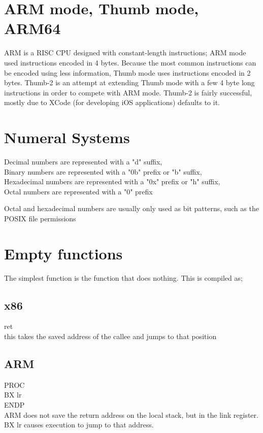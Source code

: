 \documentclass[11pt, a4paper, draft]{article}
\begin{document}
	
	\section*{ARM mode, Thumb mode, ARM64}
	ARM is a RISC CPU designed with constant-length instructions; ARM mode used instructions encoded in 4 bytes. Because the most common instructions can be encoded using less information, Thumb mode uses instructions encoded in 2 bytes. Thumb-2 is an attempt at extending Thumb mode with a few 4 byte long instructions in order to compete with ARM mode. Thumb-2 is fairly successful, mostly due to XCode (for developing iOS applications) defaults to it.
	
	\section*{Numeral Systems}
	Decimal numbers are represented with a "d" suffix,\\
	Binary numbers are represented with a "0b" prefix or "b" suffix,\\
	Hexadecimal numbers are represented with a "0x" prefix or "h" suffix,\\
	Octal numbers are represented with a "0" prefix
	
	Octal and hexadecimal numbers are usually only used as bit patterns, such as the POSIX file permissions
	
	
	\section*{Empty functions}
	The simplest function is the function that does nothing.
	This is compiled as;
	
		\subsection*{x86}
		ret\\
		this takes the saved address of the callee and jumps to that position
		
		\subsection*{ARM}
		PROC\\
		BX lr\\
		ENDP\\
		ARM does not save the return address on the local stack, but in the link register. BX lr causes execution to jump to that address.
		
\end{document}

